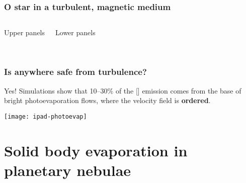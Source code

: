\documentclass[presentation, compress]{beamer}
\providecommand{\alert}[1]{\textbf{#1}}
\newcommand\backbigskip{\vspace*{-\bigskipamount}}
\begin{document}
\begin{frame}
  \frametitle{O star in a turbulent, magnetic medium}
  \begin{columns}
    \bigskip
    \begin{block}{Upper panels}
      \color{red}{[N\,II]}\quad
      \quad
      \color{blue}{[O\,III]}
    \end{block}
    \begin{block}{Lower panels}
      \color{red}{FIR Cold dust}\\
      \color{green}{MIR Warm~PAHs}\\
      \color{blue}{Radio Free-free}
    \end{block}
  \end{columns}
\end{frame}

\begin{frame}
  \frametitle{Is anywhere safe from turbulence?}
  \begin{alertblock}{Yes!}
    Simulations show that 10--30\% of the [] emission comes from the base of bright photoevaporation flows, where the velocity field is \alert{ordered}. 
  \end{alertblock}
  \backbigskip
  \hfill\texttt{[image: ipad-photoevap]}
\end{frame}


\section{Solid body evaporation in planetary nebulae}
\label{sec-6}
\end{document}
